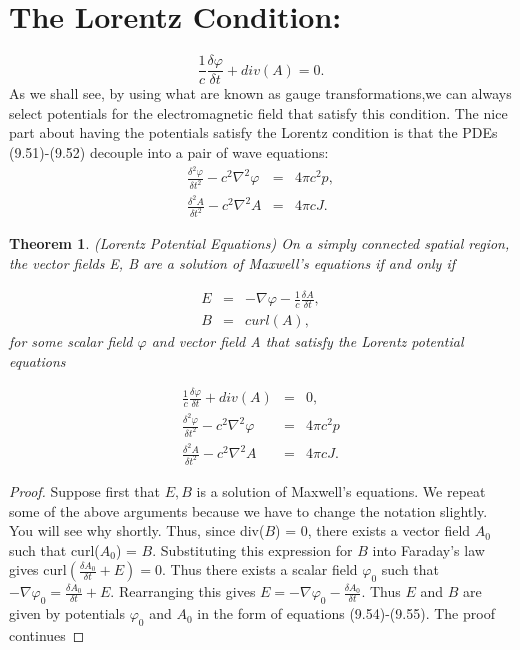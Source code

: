 \documentclass[12pt]{article}
\newtheorem{theorem}{Theorem}
\begin{document}
\section*{The Lorentz Condition:}
\begin{equation}
 \frac{1}{c} \frac{\delta \varphi}{\delta t} + div(A) = 0. %
\end{equation}
\noindent As we shall see, by using what are known as gauge transformations,we can always select potentials for the electromagnetic field that satisfy this condition. The nice part about having the potentials satisfy the Lorentz condition is that the PDEs (9.51)-(9.52) decouple into a pair of wave equations:
\begin{eqnarray*} 
\frac{\delta^2 \varphi}{\delta t^2} - c^2\nabla^2\varphi & = & 4\pi c^2 p,
\\
\frac{\delta^2 A}{\delta t^2}-c^2\nabla^2 A & =& 4\pi c J.
\end{eqnarray*}
\begin{theorem}
\label{9.2 }
(Lorentz Potential Equations) On a simply connected spatial region, the vector fields E, B are a solution of Maxwell's equations if and only if

\begin{eqnarray}
\label{eq:9.54}
E& = &-\nabla\varphi - \frac{1}{c}\frac{\delta A}{\delta t} ,
\\
B& = &curl(A), %
\end{eqnarray}
for some scalar field $\varphi$ and vector field A that satisfy the Lorentz potential equations
\end{theorem}
\begin{eqnarray}
\frac{1}{c}\frac{\delta\varphi}{\delta t} + div(A)& = &0,
\\
\frac{\delta^2\varphi}{\delta t^2} -c^2\nabla^2\varphi & = &4\pi c^2 p
\\
\frac{\delta^2A}{\delta t^2} - c^2\nabla^2A& = &4\pi c J.
\end{eqnarray}
\begin{proof}
Suppose first that $E, B$ is a solution of Maxwell's equations. We repeat some of the above arguments because we have to change the notation slightly. You will see why shortly. Thus, since div($B$) = 0, there exists a vector field $A_0$ such that curl($A_0$) = $B$. Substituting this expression for $B$ into Faraday's law gives curl$(\frac{\delta A_0}{\delta t} + E) = 0.$ Thus there exists a scalar field $\varphi_0$ such that $-\nabla\varphi_0 = \frac{\delta A_0}{\delta t} + E.$ Rearranging this gives $E = -\nabla\varphi_0 - \frac{\delta A_0}{\delta t}.$ Thus $E$ and $B$ are given by potentials $\varphi_0$ and $A_0$ in the form of equations (9.54)-(9.55). 
\newpage
The proof continues 
\end{proof}
\end{document}
